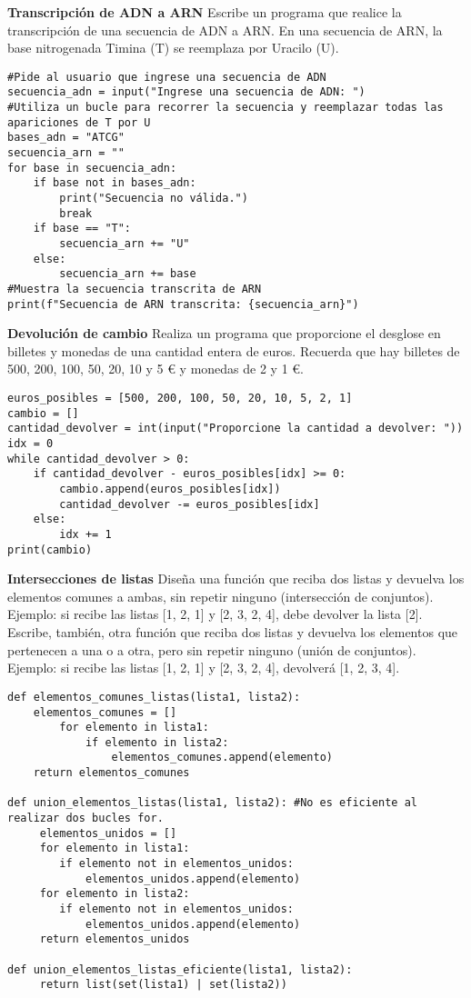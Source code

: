 \documentclass{config/ejercicios}
\begin{document}
\begin{problemS} \textbf{Transcripción de ADN a ARN}
Escribe un programa que realice la transcripción de una secuencia de ADN a ARN. En una secuencia de ARN, la base nitrogenada Timina (T) se reemplaza por Uracilo (U).
\begin{lstlisting}
#Pide al usuario que ingrese una secuencia de ADN
secuencia_adn = input("Ingrese una secuencia de ADN: ")
#Utiliza un bucle para recorrer la secuencia y reemplazar todas las apariciones de T por U
bases_adn = "ATCG"
secuencia_arn = ""
for base in secuencia_adn:
	if base not in bases_adn:
		print("Secuencia no válida.")
		break
	if base == "T":
		secuencia_arn += "U"
	else:
		secuencia_arn += base
#Muestra la secuencia transcrita de ARN
print(f"Secuencia de ARN transcrita: {secuencia_arn}")
\end{lstlisting}
\end{problemS}

\begin{problemS} \textbf{Devolución de cambio}
Realiza un programa que proporcione el desglose en billetes y monedas de una cantidad entera de euros. Recuerda que hay billetes de 500, 200, 100, 50, 20, 10 y 5 € y monedas de 2 y 1 €.
\begin{lstlisting}
euros_posibles = [500, 200, 100, 50, 20, 10, 5, 2, 1]
cambio = []
cantidad_devolver = int(input("Proporcione la cantidad a devolver: "))
idx = 0 
while cantidad_devolver > 0:
	if cantidad_devolver - euros_posibles[idx] >= 0:
		cambio.append(euros_posibles[idx])
		cantidad_devolver -= euros_posibles[idx]
	else:
		idx += 1
print(cambio)
\end{lstlisting}
\end{problemS}

\begin{problemS} \textbf{Intersecciones de listas}
Diseña una función que reciba dos listas y devuelva los elementos comunes a ambas, sin repetir ninguno (intersección de conjuntos). Ejemplo: si recibe las listas [1, 2, 1] y [2, 3, 2, 4], debe devolver la lista [2]. Escribe, también, otra función que reciba dos listas y devuelva los elementos que pertenecen a una o a otra, pero sin repetir ninguno (unión de conjuntos). Ejemplo: si recibe las listas [1, 2, 1] y [2, 3, 2, 4], devolverá [1, 2, 3, 4].
\begin{lstlisting}
def elementos_comunes_listas(lista1, lista2):
	elementos_comunes = []
		for elemento in lista1:
			if elemento in lista2:
				elementos_comunes.append(elemento)
	return elementos_comunes
	
def union_elementos_listas(lista1, lista2): #No es eficiente al realizar dos bucles for.
	 elementos_unidos = []
	 for elemento in lista1:
	 	if elemento not in elementos_unidos:
	 		elementos_unidos.append(elemento)
	 for elemento in lista2:
	 	if elemento not in elementos_unidos:
	 		elementos_unidos.append(elemento)
	 return elementos_unidos

def union_elementos_listas_eficiente(lista1, lista2):
	 return list(set(lista1) | set(lista2))
\end{lstlisting}
\end{problemS}
\end{document}
